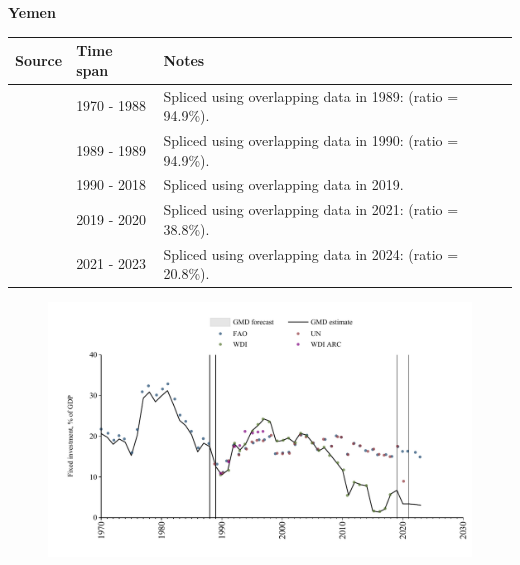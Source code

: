\documentclass[12pt,a4paper,landscape]{article}
\begin{document}
\begin{adjustbox}{max totalsize={\paperwidth}{\paperheight},center}
\begin{minipage}[t][\textheight][t]{\textwidth}
\vspace*{0.5cm}
{}
\begin{center}
{\Large\bfseries Yemen}
\end{center}
\vspace{0.5cm}
\begin{table}[H]
\centering
\small
\begin{tabular}{|l|l|l|}
\hline
\textbf{Source} & \textbf{Time span} & \textbf{Notes} \\
\hline
\rowcolor{white}\cite{FAO}& 1970 - 1988 &Spliced using overlapping data in 1989: (ratio = 94.9\%).\\
\rowcolor{lightgray}\cite{UN}& 1989 - 1989 &Spliced using overlapping data in 1990: (ratio = 94.9\%).\\
\rowcolor{white}\cite{WDI}& 1990 - 2018 &Spliced using overlapping data in 2019.\\
\rowcolor{lightgray}\cite{UN}& 2019 - 2020 &Spliced using overlapping data in 2021: (ratio = 38.8\%).\\
\rowcolor{white}\cite{FAO}& 2021 - 2023 &Spliced using overlapping data in 2024: (ratio = 20.8\%).\\
\hline
\end{tabular}
\end{table}
\begin{figure}[H]
\centering
\includegraphics[width=\textwidth,height=0.6\textheight,keepaspectratio]{graphs/YEM_finv_GDP.pdf}
\end{figure}
\end{minipage}
\end{adjustbox}
\end{document}
